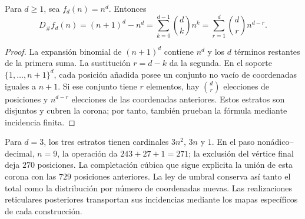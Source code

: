\begin{proposition}
Para \(d\geq1\), sea \(f_d(n)=n^d\). Entonces
\begin{equation}
 D_\#f_d(n)=(n+1)^d-n^d
 =\sum_{k=0}^{d-1}\binom dk n^k
 =\sum_{r=1}^{d}\binom dr n^{d-r}.
 \label{vi:cubo:mg07:binomio}
\end{equation}
\end{proposition}

\begin{proof}
La expansión binomial de \((n+1)^d\) contiene \(n^d\) y los
\(d\) términos restantes de la primera suma. La sustitución
\(r=d-k\) da la segunda. En el soporte
\(\{1,\ldots,n+1\}^d\), cada posición añadida posee un conjunto
no vacío de coordenadas iguales a \(n+1\). Si ese conjunto tiene
\(r\) elementos, hay \(\binom dr\) elecciones de posiciones y
\(n^{d-r}\) elecciones de las coordenadas anteriores. Estos
estratos son disjuntos y cubren la corona; por tanto, también prueban
la fórmula mediante incidencia finita.
\end{proof}

Para \(d=3\), los tres estratos tienen cardinales \(3n^2\),
\(3n\) y \(1\). En el paso nonádico--decimal, \(n=9\), la
operación da \(243+27+1=271\); la exclusión del vértice final deja
\(270\) posiciones. La completación cúbica que sigue explicita la
unión de esta corona con las \(729\) posiciones anteriores. La ley
de umbral conserva así tanto el total como la distribución por número
de coordenadas nuevas. Las realizaciones reticulares posteriores
transportan sus incidencias mediante los mapas específicos de cada
construcción.
